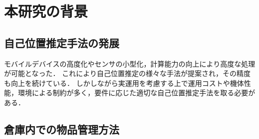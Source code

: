 \section{本研究の背景}
\subsection{自己位置推定手法の発展}
モバイルデバイスの高度化やセンサの小型化，計算能力の向上により高度な処理が可能となった．
これにより自己位置推定の様々な手法が提案され，その精度も向上を続けている．
しかしながら実運用を考慮する上で運用コストや機体性能，環境による制約が多く，要件に応じた適切な自己位置推定手法を取る必要がある．

\subsection{倉庫内での物品管理方法}